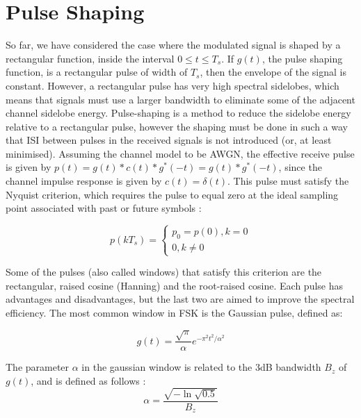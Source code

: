 \documentclass[12pt,a4paper,openright]{report}
\begin{document}
%
\section{Pulse Shaping}
\label{Sec:Pulse shapping}
So far, we have considered the case where the modulated signal is shaped by a rectangular function, inside the interval $0\leq t \leq T_s$. If $g(t)$, the pulse shaping function, is a rectangular pulse of width of $T_s$, then the envelope of the signal is constant. However, a rectangular pulse has very high spectral sidelobes, which means that signals must use a larger bandwidth to eliminate some of the adjacent channel sidelobe energy. Pulse-shaping is a method to reduce the sidelobe energy relative to a rectangular pulse, however the shaping must be done in such a way that ISI between pulses in the received signals is not introduced (or, at least minimised). Assuming the channel model to be AWGN, the effective receive pulse is given by $p(t)=g(t) \ast c(t) \ast g^{*}(-t)=g(t) \ast g^{*}(-t)$, since the channel impulse response is given by $c(t)=\delta(t)$. This pulse must satisfy the Nyquist criterion, which requires the pulse to equal zero at the ideal sampling point associated with past or future symbols \cite{GoertzelPaper}: 

 \begin{equation}
 p(k{T_s}) = \left\{ \begin{array}{l}
 {p_0} = p(0),k = 0\\
 0,k \ne 0
 \end{array} \right.
 \end{equation}
 
Some of the pulses (also called windows) that satisfy this criterion are the rectangular, raised cosine (Hanning) and the root-raised cosine. Each pulse has advantages and disadvantages, but the last two are aimed to improve the spectral efficiency. The most common window in FSK is the Gaussian pulse, defined as: 

 
\begin{equation}\label{Eq:Gaussian Window}
g(t) = \frac{{\sqrt \pi  }}{\alpha }{e^{ - {\pi ^2}{t^2}/{\alpha ^2}}}
\end{equation}

 The parameter $\alpha$ in the gaussian window is related to the 3dB bandwidth $B_z$ of $g(t)$, and is defined as follows \cite{GoertzelPaper}:
\begin{equation}
\alpha  = \frac{{\sqrt { - \ln \sqrt {0.5} } }}{{{B_z}}}
\end{equation}
 
\end{document}
